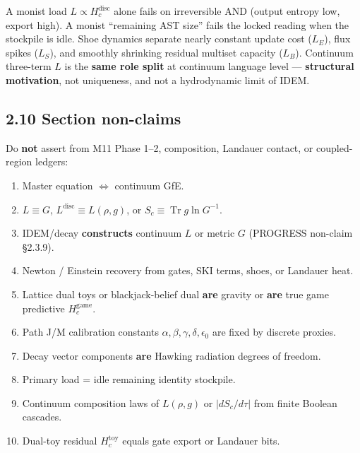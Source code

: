 \documentclass[
  11pt,
]{article}
\providecommand{\tightlist}{%
  \setlength{\itemsep}{0pt}\setlength{\parskip}{0pt}}
\begin{document}
A monist load \(L\propto H_c^{\mathrm{disc}}\) alone fails on irreversible AND (output entropy low, export high). A monist ``remaining AST size'' fails the locked reading when the stockpile is idle. Shoe dynamics separate nearly constant update cost (\(L_E\)), flux spikes (\(L_S\)), and smoothly shrinking residual multiset capacity (\(L_B\)). Continuum three-term \(L\) is the \textbf{same role split} at continuum language level --- \textbf{structural motivation}, not uniqueness, and not a hydrodynamic limit of IDEM.

\subsection{2.10 Section non-claims}\label{section-non-claims}

Do \textbf{not} assert from M11 Phase 1--2, composition, Landauer contact, or coupled-region ledgers:

\begin{enumerate}
\def\labelenumi{\arabic{enumi}.}
\tightlist
\item
  Master equation \(\Leftrightarrow\) continuum GfE.\\
\item
  \(L\equiv G\), \(L^{\mathrm{disc}}\equiv L(\rho,g)\), or \(S_c\equiv\operatorname{Tr} g\ln G^{-1}\).\\
\item
  IDEM/decay \textbf{constructs} continuum \(L\) or metric \(G\) (PROGRESS non-claim \S2.3.9).\\
\item
  Newton / Einstein recovery from gates, SKI terms, shoes, or Landauer heat.\\
\item
  Lattice dual toys or blackjack-belief dual \textbf{are} gravity or \textbf{are} true game predictive \(H_c^{\mathrm{game}}\).\\
\item
  Path J/M calibration constants \(\alpha,\beta,\gamma,\delta,\epsilon_0\) are fixed by discrete proxies.\\
\item
  Decay vector components \textbf{are} Hawking radiation degrees of freedom.\\
\item
  Primary load = idle remaining identity stockpile.\\
\item
  Continuum composition laws of \(L(\rho,g)\) or \(\lvert dS_c/d\tau\rvert\) from finite Boolean cascades.\\
\item
  Dual-toy residual \(H_c^{\mathrm{toy}}\) equals gate export or Landauer bits.
\end{enumerate}
\end{document}
